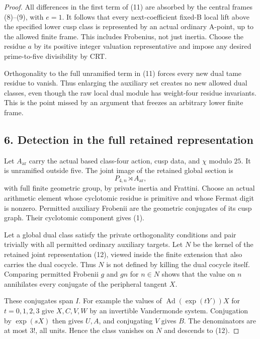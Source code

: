 \documentclass[11pt]{article}
\begin{document}
\begin{proof}
All differences in the first term of (11) are absorbed by the central frames (8)--(9), with $e=1$. It follows that every next-coefficient fixed-B local lift above the specified lower cusp class is represented by an actual ordinary A-point, up to the allowed finite frame. This includes Frobenius, not just inertia. Choose the residue $a$ by its positive integer valuation representative and impose any desired prime-to-five divisibility by CRT.

Orthogonality to the full unramified term in (11) forces every new dual tame residue to vanish. Thus enlarging the auxiliary set creates no new allowed dual classes, even though the raw local dual module has weight-four residue invariants. This is the point missed by an argument that freezes an arbitrary lower finite frame.

\subsection*{6. Detection in the full retained representation}
Let $A_{\mathrm{ar}}$ carry the actual based class-four action, cusp data, and $\chi$ modulo $25$. It is unramified outside five. The joint image of the retained global section is
\[
 P_{4,n}\rtimes A_{\mathrm{ar}},
 \tag{12}
\]
with full finite geometric group, by private inertia and Frattini. Choose an actual arithmetic element whose cyclotomic residue is primitive and whose Fermat digit is nonzero. Permitted auxiliary Frobenii are the geometric conjugates of its cusp graph. Their cyclotomic component gives (1).

Let a global dual class satisfy the private orthogonality conditions and pair trivially with all permitted ordinary auxiliary targets. Let $N$ be the kernel of the retained joint representation (12), viewed inside the finite extension that also carries the dual cocycle. Thus $N$ is not defined by killing the dual cocycle itself. Comparing permitted Frobenii $g$ and $gn$ for $n\in N$ shows that the value on $n$ annihilates every conjugate of the peripheral tangent $X$.

These conjugates span $I$. For example the values of $\operatorname{Ad}(\exp(tY))X$ for $t=0,1,2,3$ give $X,C,V,W$ by an invertible Vandermonde system. Conjugation by $\exp(sX)$ then gives $U,A$, and conjugating $V$ gives $B$. The denominators are at most $3!$, all units. Hence the class vanishes on $N$ and descends to (12).


\end{proof}
\end{document}
